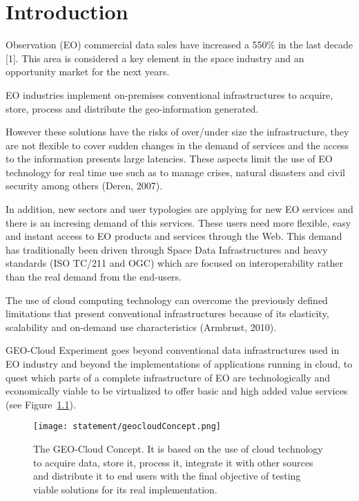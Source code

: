\chapter{Introduction}

 Observation (EO) commercial data sales have increased a 550\% in
the last decade \cite{sousa}[1]. This area is considered a key element in the
space industry and an opportunity market for the next years.

\ac{EO} industries implement on-premises conventional infrastructures to acquire,
store, process and distribute the geo-information generated.

However these solutions have the risks of over/under size the infrastructure, they are not flexible to cover sudden changes in the demand of services and the access to the information presents large latencies.  These aspects limit the use of \ac{EO} technology for real time use such as to manage crises, natural disasters and civil security among others (Deren, 2007).

In addition, new sectors and user typologies are applying for new \ac{EO} services
and there is an incresing demand of this services. These users
need more flexible, easy and instant access to \ac{EO} products and services through
the Web. This demand has traditionally been driven through Space Data
Infrastructures and heavy standards (ISO TC/211 and OGC) which are focused on
interoperability rather than the real demand from the end-users.

The use of cloud computing technology can overcome the previously defined limitations that present conventional infrastructures because of its elasticity, scalability and on-demand use characteristics (Armbrust, 2010).

GEO-Cloud Experiment goes beyond conventional data infrastructures used in \ac{EO}
industry and beyond the implementations of applications running in cloud, to
quest which parts of a complete infrastructure of \ac{EO} are technologically and
economically viable to be virtualized to offer basic and high added value
services (see Figure~\ref{fig:intr-geocloudConcept}).

\begin{figure}[!h]
\begin{center}
\texttt{[image: statement/geocloudConcept.png]}
\caption{The GEO-Cloud Concept. It is based on the use of cloud technology to acquire data, store it, process it, integrate it with other sources and distribute it to end users with the final objective of testing viable solutions for its real implementation.}
\label{fig:intr-geocloudConcept}
\end{center}
\end{figure}

